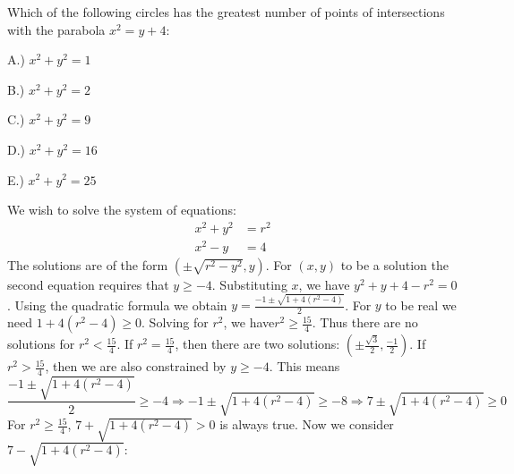 \documentclass[crop=false,class=book,oneside]{standalone}                      %
\begin{document}
            \begin{lexample}
                Which of the following circles has
                the greatest number of
                points of intersections with the parabola $x^{2}=y+4$:
                \begin{enumerate}
                    \begin{multicols}{5}
                        \item[A.)] $x^{2}+y^{2}=1$
                        \item[B.)] $x^{2}+y^{2}=2$
                        \item[C.)] $x^{2}+y^{2}=9$
                        \item[D.)] $x^{2}+y^{2}=16$
                        \item[E.)] $x^{2}+y^{2}=25$
                    \end{multicols}
                \end{enumerate}
                We wish to solve the system of equations:
                \begin{align*}
                    x^{2}+y^{2}&=r^{2}\\
                    x^{2}-y&=4
                \end{align*}
                The solutions are of the form $(\pm \sqrt{r^2-y^2},y)$.
                For $(x,y)$ to be a solution
                the second equation requires
                that $y\geq -4$. Substituting $x$, we have
                $y^{2}+y+4-r^{2}=0$. Using the quadratic formula
                we obtain
                $y=\frac{-1\pm\sqrt{1+4(r^{2}-4)}}{2}$.
                For $y$ to be real
                we need $1+4(r^{2}-4)\geq 0$. Solving for $r^2$,
                we have$r^{2}\geq\frac{15}{4}$.
                Thus there are no solutions for
                $r^{2}<\frac{15}{4}$. If $r^{2}=\frac{15}{4}$,
                then there are two solutions:
                $(\pm\frac{\sqrt{3}}{2},\frac{-1}{2})$. If
                $r^{2}>\frac{15}{4}$, then we are
                also constrained by $y\geq-4$. This means 
                \begin{equation*}
                    \frac{-1\pm\sqrt{1+4(r^{2}-4)}}{2}\geq-4
                    \Rightarrow -1\pm\sqrt{1+4(r^{2}-4)}\geq-8
                    \Rightarrow 7\pm\sqrt{1+4(r^{2}-4)}\geq 0
                \end{equation*}
                For $r^2 \geq \frac{15}{4}$, $7+\sqrt{1+4(r^2-4)}>0$
                is always true. Now we consider $7-\sqrt{1+4(r^2-4)}:$

\end{lexample}
\end{document}
